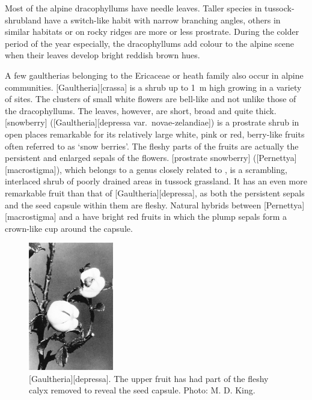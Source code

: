 Most of the alpine dracophyllums have needle leaves.
Taller species in tussock-shrubland have a switch-like habit with narrow branching angles, others in similar habitats or on rocky ridges are more or less prostrate.
During the colder period of the year especially, the dracophyllums add colour to the alpine scene when their leaves develop bright reddish brown hues.

A few gaultherias belonging to the Ericaceae or heath family also occur in alpine communities. [Gaultheria][crassa] is a shrub up to \SI{1}{\metre} high growing in a variety of sites.
The clusters of small white flowers are bell-like and not unlike those of the dracophyllums.
The leaves, however, are short, broad and quite thick. [snowberry] ([Gaultheria][depressa var.\ novae-zelandiae]) is a prostrate shrub in open places remarkable for its relatively large white, pink or red, berry-like fruits often referred to as `snow berries'.
The fleshy parts of the fruits are actually the persistent and enlarged sepals of the flowers. [prostrate snowberry] ([Pernettya][macrostigma]), which belongs to a genus closely related to , is a scrambling, interlaced shrub of poorly drained areas in tussock grassland.
It has an even more remarkable fruit than that of [Gaultheria][depressa], as both the persistent sepals and the seed capsule within them are fleshy.
Natural hybrids between [Pernettya][macrostigma] and a  have bright red fruits in which the plump sepals form a crown-like cup around the capsule.

\begin{figure}
	\includegraphics[width=0.33\textwidth]{graphics/figure94gaultheria.jpg}
	\centering
	\caption[\emph{Gaultheria depressa}]{[Gaultheria][depressa].
	The upper fruit has had part of the fleshy calyx removed to reveal the seed capsule.
	Photo: M. D. King.}%
	\label{fig:94gaultheria}
\end{figure}

